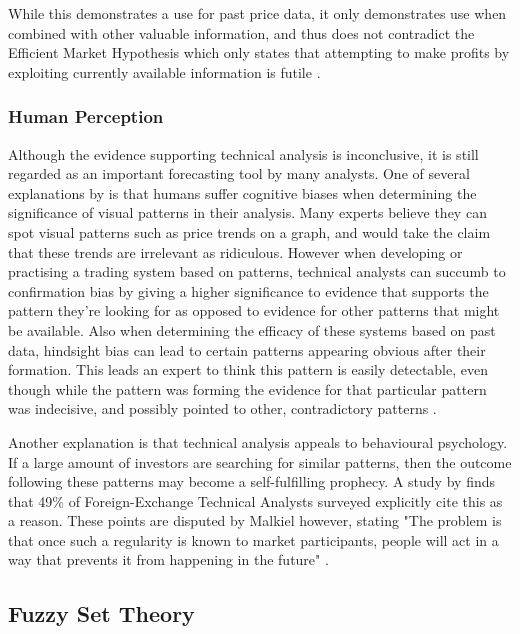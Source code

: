 \documentclass{article}
\theoremstyle{definition}
\begin{document}
While this demonstrates a use for past price data, it only demonstrates use when combined with other valuable information, and thus does not contradict the Efficient Market Hypothesis which only states that attempting to make profits by exploiting currently available information is futile \citep{taprofitability}.

\subsubsection{Human Perception}

\label{tahumanz}

Although the evidence supporting technical analysis is inconclusive, it is still regarded as an important forecasting tool by many analysts. One of several explanations by \cite[p.45-71]{aronson2011evidence} is that humans suffer cognitive biases when determining the significance of visual patterns in their analysis. Many experts believe they can spot visual patterns such as price trends on a graph, and would take the claim that these trends are irrelevant as ridiculous. However when developing or practising a trading system based on patterns, technical analysts can succumb to confirmation bias by giving a higher significance to evidence that supports the pattern they're looking for as opposed to evidence for other patterns that might be available. Also when determining the efficacy of these systems based on past data, hindsight bias can lead to certain patterns appearing obvious after their formation. This leads an expert to think this pattern is easily detectable, even though while the pattern was forming the evidence for that particular pattern was indecisive, and possibly pointed to other, contradictory patterns \cite[p.62]{aronson2011evidence}.

Another explanation is that technical analysis appeals to behavioural psychology. If a large amount of investors are searching for similar patterns, then the outcome following these patterns may become a self-fulfilling prophecy. A study by \cite{examininguse1997} finds that 49\% of Foreign-Exchange Technical Analysts surveyed explicitly cite this as a reason. These points are disputed by Malkiel however, stating "The problem is that once such a regularity is known to market participants, people will act in a way that prevents it from happening in the future" \cite[p.162]{randomwalk2012}.

\subsection{Fuzzy Set Theory}
\end{document}
